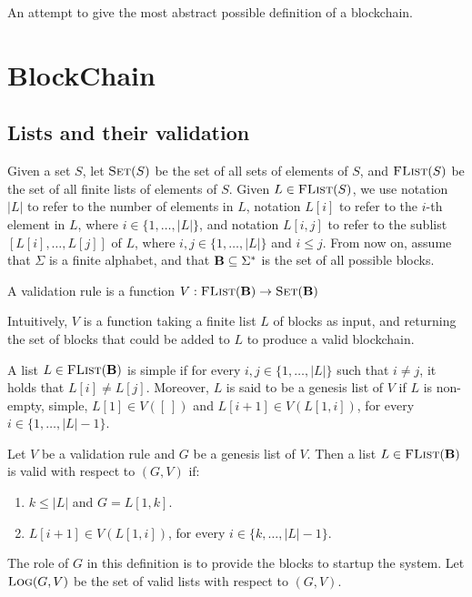 
An attempt to give the most abstract possible definition of a blockchain.

\section{BlockChain}
\medskip
\noindent
\subsection{Lists and their validation}

Given a set $S$, let $\text{\sc Set}(S)$ be the set of all sets of elements of $S$, and $\text{\sc FList}(S)$ be the set of all finite lists of elements of $S$. Given $L \in \text{\sc FList}(S)$, we use notation $|L|$ to refer to the number of elements in $L$, notation $L[i]$ to refer to the $i$-th element in $L$, where $i \in \{1, \ldots, |L|\}$, and notation $L[i,j]$ to refer to the sublist $[L[i], \ldots, L[j]]$ of $L$, where $i,j \in \{1, \ldots, |L|\}$ and $i \leq j$. From now on, assume that $\Sigma$ is a finite alphabet, and that $\text{\bf B} \subseteq \Sigma^*$ is the set of all possible blocks.  

\begin{mydef}
A validation rule is a function $V : \text{\sc FList}(\text{\bf B}) \to \text{\sc Set}(\text{\bf B})$
\end{mydef}
Intuitively, $V$ is a function taking a finite list $L$ of blocks as input, and returning the set of blocks that could be added to $L$ to produce a valid blockchain.

A list $L \in \text{\sc FList}(\text{\bf B})$ is simple if for every $i,j \in \{1, \ldots, |L|\}$ such that $i \neq j$, it holds that $L[i] \neq L[j]$. Moreover, $L$ is said to be a genesis list of $V$ if $L$ is non-empty, simple, $L[1] \in V([\ ])$ and $L[i+1] \in V(L[1,i])$, for every $i \in \{1, \ldots, |L|-1\}$.

\begin{mydef}
Let $V$ be a validation rule and $G$ be a genesis list of $V$. Then a list $L \in \text{\sc FList}(\text{\bf B})$ is valid with respect to $(G,V)$ if:
\begin{enumerate}
\item $k \leq |L|$ and $G = L[1,k]$.

\item $L[i+1] \in V(L[1,i])$, for every $i \in \{k, \ldots, |L|-1\}$.
\end{enumerate}
\end{mydef}
The role of $G$ in this definition is to provide the blocks to startup the system. Let $\text{\sc Log}(G,V)$ be the set of valid lists with respect to $(G,V)$.

